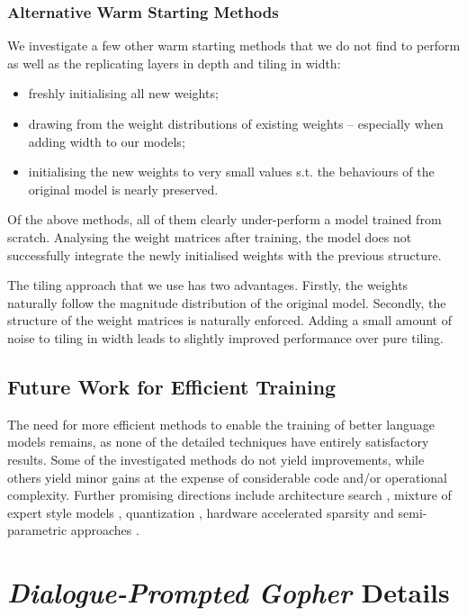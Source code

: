 \documentclass[11pt, a4paper, logo, internal, copyright, nonumbering]{deepmind}
\newcommand{\gopherchat}{\textit{Dialogue-Prompted Gopher}\xspace}
\begin{document}
\subsubsection{Alternative Warm Starting Methods}

We investigate a few other warm starting methods that we do not find to perform as well as the replicating layers in depth and tiling in width:
\begin{itemize}
    \item freshly initialising all new weights;
    \item drawing from the weight distributions of existing weights -- especially when adding width to our models;
    \item initialising the new weights to very small values s.t. the behaviours of the original model is nearly preserved.
\end{itemize}
Of the above methods, all of them clearly under-perform a model trained from scratch. 
Analysing the weight matrices after training, the model does not successfully integrate the newly initialised weights with the previous structure.

The tiling approach that we use has two advantages. Firstly, the weights naturally follow the magnitude distribution of the original model.
Secondly, the structure of the weight matrices is naturally enforced.
Adding a small amount of noise to tiling in width leads to slightly improved performance over pure tiling.

\subsection{Future Work for Efficient Training}

The need for more efficient methods to enable the training of better language models remains, as none of the detailed techniques have entirely satisfactory results. Some of the investigated methods do not yield improvements, while others yield minor gains at the expense of considerable code and/or operational complexity.
%
Further promising directions include architecture search \citep{so2021primer, pmlr-v97-so19a}, mixture of expert style models \citep{fedus2021switch, roller2021hash, lewis2021base, kim2021scalable}, quantization \citep{q8bert}, hardware accelerated sparsity \citep{mishra2021accelerating} and semi-parametric approaches \citep{guu2020realm, Khandelwal2020Generalization, perez2019finding, borgeaud2021retrieval}. 

\section{\gopherchat Details}
\label{appendix:gopherchat}
\end{document}
